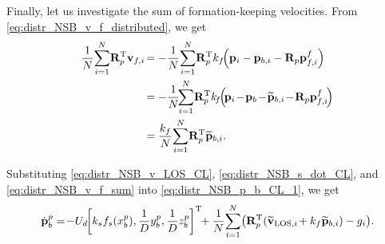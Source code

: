 Finally, let us investigate the sum of formation-keeping velocities.
From \eqref{eq:distr_NSB_v_f_distributed}, we get
\begin{equation}
    \begin{split}
    \frac{1}{N} \! \sum_{i=1}^N \! \mat{R}_p\T \ivel_{f, i\!} &= -\frac{1}{N} \! \sum_{i=1}^N \! \mat{R}_p\T k_f \!\! \left(\mat{p}_i - \mat{p}_{b,i} - \mat{R}_p\mat{p}_{f, i}^f\right) \\
    &= -\frac{1}{N} \!\! \sum_{i=1}^N \! \mat{R}_p\T k_{\!f\!} \! \left(\! \mat{p}_{i\!} -\! \mat{p}_{b\!} -\! \widetilde{\mat{p}}_{b, i\!} -\! \mat{R}_p\mat{p}_{f, i\!}^f\right) \\
    &= \frac{k_f}{N} \! \sum_{i=1}^N \! \mat{R}_p\T \widetilde{\mat{p}}_{b, i}.
    \end{split}
    \label{eq:distr_NSB_v_f_sum}
\end{equation}

Substituting \eqref{eq:distr_NSB_v_LOS_CL}, \eqref{eq:distr_NSB_s_dot_CL}, and \eqref{eq:distr_NSB_v_f_sum} into \eqref{eq:distr_NSB_p_b_CL_1}, we get
\begin{equation}
        \dot{\mat{p}}_b^p =\! - U_{d\!} \!\inlinevector{k_s f_s\!\left(x_b^p\right)\!, \frac{1}{D} y_b^p, \frac{1}{D} z_b^p}\!\! + \frac{1}{N}\! \sum_{i=1}^N\! \left(\mat{R}_p\T \!\left(\widetilde{\ivel}_{{\rm LOS}, i\!} + k_f \widetilde{\mat{p}}_{b, i}\right) - g_i \right)\!.
    \label{eq:distr_NSB_p_b_CL}
\end{equation}

